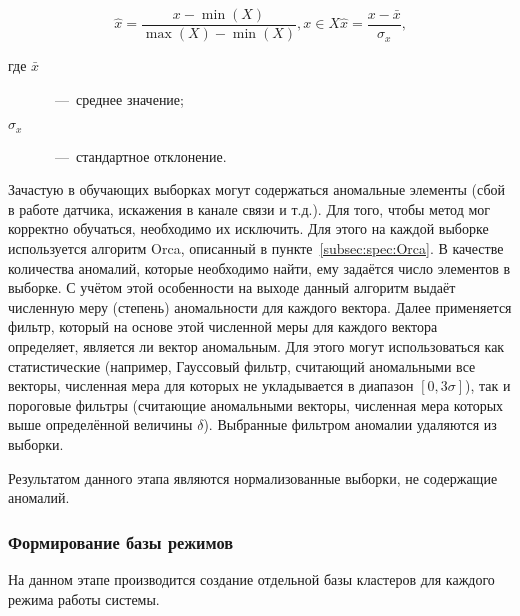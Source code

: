 \begin{subequations}
\begin{equation} \label{eq:spec:DDMS:MinimaxNormalization}
\hat{x} = \frac{x - \min(X)}{\max(X) - \min(X)}, x\in X
\end{equation}
\begin{equation} \label{eq:spec:DDMS:StandardNormalization}
\hat{x} = \frac{x - \bar{x}}{\sigma_x} \text{,}
\end{equation}
\end{subequations}
\begin{description}
	\item[где $\bar{x}$]~---~среднее значение;
	\item[$\sigma_x$]~---~стандартное отклонение.
\end{description}

Зачастую в обучающих выборках могут содержаться аномальные элементы (сбой в работе датчика, искажения в канале связи и т.д.). Для того, чтобы метод мог корректно обучаться, необходимо их исключить. Для этого на каждой выборке используется алгоритм Orca, описанный в пункте~\ref{subsec:spec:Orca}. В качестве количества аномалий, которые необходимо найти, ему задаётся число элементов в выборке. С учётом этой особенности на выходе данный алгоритм выдаёт численную меру (степень) аномальности для каждого вектора. Далее применяется фильтр, который на основе этой численной меры для каждого вектора определяет, является ли вектор аномальным. Для этого могут использоваться как статистические (например, Гауссовый фильтр, считающий аномальными все векторы, численная мера для которых не укладывается в диапазон $[0, 3\sigma]$), так и пороговые фильтры (считающие аномальными векторы, численная мера которых выше определённой величины $\delta$). Выбранные фильтром аномалии удаляются из выборки.

Результатом данного этапа являются нормализованные выборки, не содержащие аномалий.

\subsubsection{Формирование базы режимов}
На данном этапе производится создание отдельной базы кластеров для каждого режима работы системы.